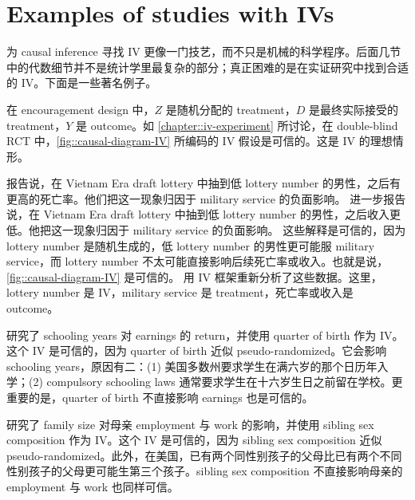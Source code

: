 \section{Examples of studies with IVs}
 
 
 
为 causal inference 寻找 IV 更像一门技艺，而不只是机械的科学程序。后面几节中的代数细节并不是统计学里最复杂的部分；真正困难的是在实证研究中找到合适的 IV。下面是一些著名例子。  


\begin{example} 
在 encouragement design 中，$Z$ 是随机分配的 treatment，$D$ 是最终实际接受的 treatment，$Y$ 是 outcome。如 \cref{chapter::iv-experiment} 所讨论，在 double-blind RCT 中，\cref{fig::causal-diagram-IV} 所编码的 IV 假设是可信的。这是 IV 的理想情形。 
\end{example}


 
 
 \begin{example}
 \citet{hearst1986delayed} 报告说，在 Vietnam Era draft lottery 中抽到低 lottery number 的男性，之后有更高的死亡率。他们把这一现象归因于 military service 的负面影响。
 \citet{angrist1990lifetime} 进一步报告说，在 Vietnam Era draft lottery 中抽到低 lottery number 的男性，之后收入更低。他把这一现象归因于 military service 的负面影响。 
 这些解释是可信的，因为 lottery number 是随机生成的，低 lottery number 的男性更可能服 military service，而 lottery number 不太可能直接影响后续死亡率或收入。也就是说，\cref{fig::causal-diagram-IV} 是可信的。 
\citet{angrist1996identification} 用 IV 框架重新分析了这些数据。这里，lottery number 是 IV，military service 是 treatment，死亡率或收入是 outcome。 
\end{example}




\begin{example}
\citet{angrist1991does} 研究了 schooling years 对 earnings 的 return，并使用 quarter of birth 作为 IV。这个 IV 是可信的，因为 quarter of birth 近似 pseudo-randomized。它会影响 schooling years，原因有二：(1) 美国多数州要求学生在满六岁的那个日历年入学；(2) compulsory schooling laws 通常要求学生在十六岁生日之前留在学校。更重要的是，quarter of birth 不直接影响 earnings 也是可信的。 
\end{example}


\begin{example}
\citet{angrist1998children} 研究了 family size 对母亲 employment 与 work 的影响，并使用 sibling sex composition 作为 IV。这个 IV 是可信的，因为 sibling sex composition 近似 pseudo-randomized。此外，在美国，已有两个同性别孩子的父母比已有两个不同性别孩子的父母更可能生第三个孩子。sibling sex composition 不直接影响母亲的 employment 与 work 也同样可信。 
\end{example}


